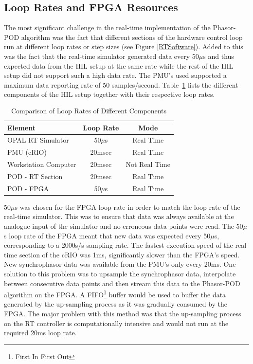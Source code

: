 \documentclass[journal]{IEEEtran}
\begin{document}
\subsection{Loop Rates and FPGA Resources}\label{looprate}
The most significant challenge in the real-time implementation of the Phasor-POD algorithm was the fact that different sections of the hardware control loop run at different loop rates or step sizes (see Figure \ref{RTSoftware}). Added to this was the fact that the real-time simulator generated data every 50$\mu$s and thus expected data from the HIL setup at the same rate while the rest of the HIL setup did not support such a high data rate. The PMU\rq{s} used supported a maximum data reporting rate of 50 samples/second. Table~\ref{ex:LoopRates} lists the different components of the HIL setup together with their respective loop rates.
\begin{table}[!ht]
\caption{Comparison of Loop Rates of Different Components}\label{ex:LoopRates}
\begin{center}
\begin{tabular}{|l|c|c|}
\hline \textbf{Element} & \textbf{Loop Rate} & \textbf{Mode} \\
\hline OPAL RT Simulator & 50$\mu$s & Real Time \\ 
\hline PMU (cRIO) & 20msec & Real Time \\ 
\hline Workstation Computer& 20msec & Not Real Time \\ 
\hline POD - RT Section & 20msec & Real Time \\ 
\hline POD - FPGA & 50$\mu$s & Real Time \\ 
\hline 
\end{tabular}
\end{center}
\end{table} 

50$\mu$s was chosen for the FPGA loop rate in order to match the loop rate of the real-time simulator. This was to ensure that data was always available at the analogue input of the simulator and no erroneous data points were read. The 50$\mu$s loop rate of the FPGA meant that new data was expected every 50$\mu$s, corresponding to a 2000s/s sampling rate. The fastest execution speed of the real-time section of the cRIO was 1ms, significantly slower than the FPGA\rq{s} speed. New synchrophasor data was available from the PMU\rq{s} only every 20ms. One solution to this problem was to upsample the synchrophasor data, interpolate between consecutive data points and then stream this data to the Phasor-POD algorithm on the FPGA. A FIFO\footnote{First In First Out} buffer would be used to buffer the data generated by the up-sampling process as it was gradually consumed by the FPGA. The major problem with this method was that the up-sampling process on the RT controller is computationally intensive and would not run at the required 20ms loop rate.\\
\end{document}
